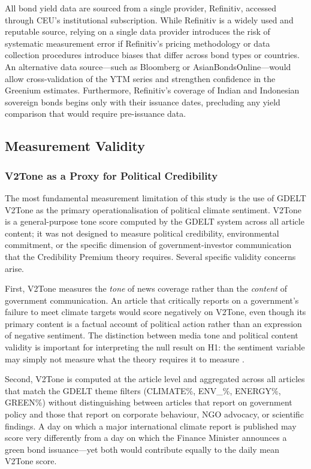 \documentclass[12pt,a4paper]{article}
\begin{document}
All bond yield data are sourced from a single provider, Refinitiv, accessed through CEU's institutional subscription. While Refinitiv is a widely used and reputable source, relying on a single data provider introduces the risk of systematic measurement error if Refinitiv's pricing methodology or data collection procedures introduce biases that differ across bond types or countries. An alternative data source---such as Bloomberg or AsianBondsOnline---would allow cross-validation of the YTM series and strengthen confidence in the Greenium estimates. Furthermore, Refinitiv's coverage of Indian and Indonesian sovereign bonds begins only with their issuance dates, precluding any yield comparison that would require pre-issuance data.

\subsection{Measurement Validity}

\subsubsection{V2Tone as a Proxy for Political Credibility}

The most fundamental measurement limitation of this study is the use of GDELT V2Tone as the primary operationalisation of political climate sentiment. V2Tone is a general-purpose tone score computed by the GDELT system across all article content; it was not designed to measure political credibility, environmental commitment, or the specific dimension of government-investor communication that the Credibility Premium theory requires. Several specific validity concerns arise.

First, V2Tone measures the \textit{tone} of news coverage rather than the \textit{content} of government communication. An article that critically reports on a government's failure to meet climate targets would score negatively on V2Tone, even though its primary content is a factual account of political action rather than an expression of negative sentiment. The distinction between media tone and political content validity is important for interpreting the null result on H1: the sentiment variable may simply not measure what the theory requires it to measure \citep{Grimmer2013}.

Second, V2Tone is computed at the article level and aggregated across all articles that match the GDELT theme filters (CLIMATE\%, ENV\_\%, ENERGY\%, GREEN\%) without distinguishing between articles that report on government policy and those that report on corporate behaviour, NGO advocacy, or scientific findings. A day on which a major international climate report is published may score very differently from a day on which the Finance Minister announces a green bond issuance---yet both would contribute equally to the daily mean V2Tone score.
\end{document}
